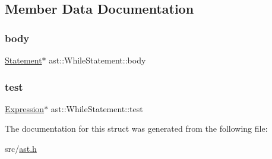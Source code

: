 \subsection{Member Data Documentation}
\mbox{\label{structast_1_1_while_statement_a2bbde085867f2ab699a5795edee77ff3}} 
\subsubsection{\texorpdfstring{body}{body}}
{\footnotesize\ttfamily \hyperlink{structast_1_1_statement}{Statement}$\ast$ ast\+::\+While\+Statement\+::body}

\mbox{\label{structast_1_1_while_statement_a62b08ab6d74dc0d29d66beb2e1b3dbc4}} 
\subsubsection{\texorpdfstring{test}{test}}
{\footnotesize\ttfamily \hyperlink{structast_1_1_expression}{Expression}$\ast$ ast\+::\+While\+Statement\+::test}



The documentation for this struct was generated from the following file\+:\begin{DoxyCompactItemize}
\item 
src/\hyperlink{ast_8h}{ast.\+h}\end{DoxyCompactItemize}

